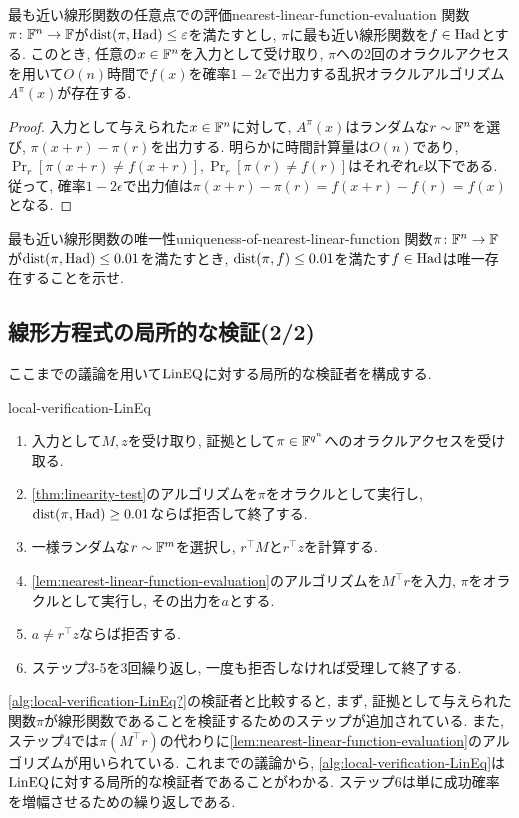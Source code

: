   \begin{lemma}{最も近い線形関数の任意点での評価}{nearest-linear-function-evaluation}
    関数$\pi\colon\mathbb{F}^n\to\mathbb{F}$が$\mathrm{dist}(\pi,\mathrm{Had})\le \varepsilon$を満たすとし,
    $\pi$に最も近い線形関数を$f\in\mathrm{Had}$とする.
    このとき, 任意の$x\in\mathbb{F}^n$を入力として受け取り, $\pi$への2回のオラクルアクセスを用いて$O(n)$時間で$f(x)$を確率$1-2\epsilon$で出力する乱択オラクルアルゴリズム$A^\pi(x)$が存在する.
  \end{lemma}
  \begin{proof}
    入力として与えられた$x\in\mathbb{F}^n$に対して, $A^\pi(x)$はランダムな$r\sim\mathbb{F}^n$を選び, $\pi(x+r)-\pi(r)$を出力する.
    明らかに時間計算量は$O(n)$であり, $\Pr_r[\pi(x+r)\ne f(x+r)], \Pr_r[\pi(r)\ne f(r)]$はそれぞれ$\epsilon$以下である.
    従って, 確率$1-2\epsilon$で出力値は$\pi(x+r)-\pi(r)=f(x+r)-f(r)=f(x)$となる.
  \end{proof}
  
  \begin{exercise}{最も近い線形関数の唯一性}{uniqueness-of-nearest-linear-function}
  関数$\pi\colon\mathbb{F}^n\to \mathbb{F}$が$\mathrm{dist}(\pi,\mathrm{Had}) \le 0.01$を満たすとき,
  $\mathrm{dist}(\pi,f)\le 0.01$を満たす$f\in\mathrm{Had}$は唯一存在することを示せ.
  \end{exercise}


\subsection{線形方程式の局所的な検証(2/2)}
ここまでの議論を用いて$\text{LinEQ}$に対する局所的な検証者を構成する.
\begin{algo}{}{local-verification-LinEq}
  \begin{enumerate}
    \item 入力として$M,z$を受け取り, 証拠として$\pi \in \mathbb{F}^{q^n}$へのオラクルアクセスを受け取る.
    \item \cref{thm:linearity-test}のアルゴリズムを$\pi$をオラクルとして実行し, $\mathrm{dist}(\pi,\mathrm{Had})\ge 0.01$ならば拒否して終了する.
    \item 一様ランダムな$r\sim\mathbb{F}^m$を選択し, $r^\top M$と$r^\top z$を計算する.
    \item \cref{lem:nearest-linear-function-evaluation}のアルゴリズムを$M^\top r$を入力, $\pi$をオラクルとして実行し, その出力を$a$とする.
    \item $a\ne r^\top z$ならば拒否する.
    \item ステップ3-5を3回繰り返し, 一度も拒否しなければ受理して終了する.
  \end{enumerate}
\end{algo}
\cref{alg:local-verification-LinEq?}の検証者と比較すると,
まず, 証拠として与えられた関数$\pi$が線形関数であることを検証するためのステップが追加されている.
また, ステップ4では$\pi(M^\top r)$の代わりに\cref{lem:nearest-linear-function-evaluation}のアルゴリズムが用いられている.
これまでの議論から, \cref{alg:local-verification-LinEq}は$\text{LinEQ}$に対する局所的な検証者であることがわかる.
ステップ6は単に成功確率を増幅させるための繰り返しである.

